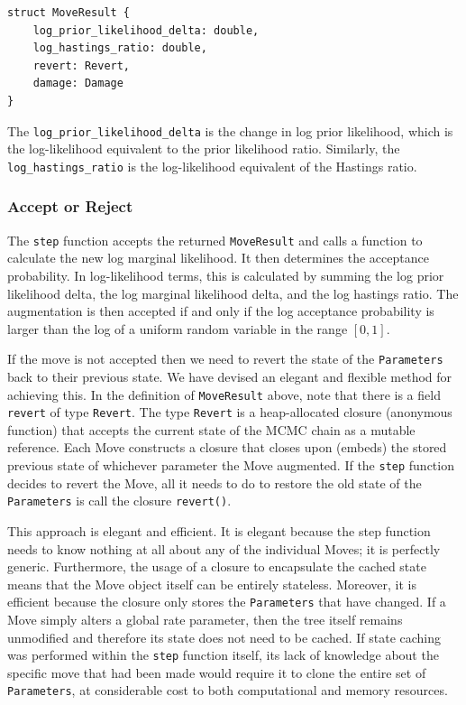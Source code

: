\documentclass[10pt,journal,compsoc]{IEEEtran}
\begin{document}
\begin{verbatim}
struct MoveResult {
    log_prior_likelihood_delta: double,
    log_hastings_ratio: double,
    revert: Revert,
    damage: Damage
}
\end{verbatim}

The \texttt{log\_prior\_likelihood\_delta} is the change in log prior likelihood, which is the log-likelihood equivalent to the prior likelihood ratio. Similarly, the \texttt{log\_hastings\_ratio} is the log-likelihood equivalent of the Hastings ratio.

\subsubsection{Accept or Reject}

The \texttt{step} function accepts the returned \texttt{MoveResult} and calls a function to calculate the new log marginal likelihood. It then determines the acceptance probability. In log-likelihood terms, this is calculated by summing the log prior likelihood delta, the log marginal likelihood delta, and the log hastings ratio. The augmentation is then accepted if and only if the log acceptance probability is larger than the log of a uniform random variable in the range $[0, 1]$.

If the move is not accepted then we need to revert the state of the \texttt{Parameters} back to their previous state. We have devised an elegant and flexible method for achieving this. In the definition of \texttt{MoveResult} above, note that there is a field \texttt{revert} of type \texttt{Revert}. The type \texttt{Revert} is a heap-allocated closure (anonymous function) that accepts the current state of the MCMC chain as a mutable reference. Each Move constructs a closure that closes upon (embeds) the stored previous state of whichever parameter the Move augmented. If the \texttt{step} function decides to revert the Move, all it needs to do to restore the old state of the \texttt{Parameters} is call the closure \texttt{revert()}.

This approach is elegant and efficient. It is elegant because the step function needs to know nothing at all about any of the individual Moves; it is perfectly generic. Furthermore, the usage of a closure to encapsulate the cached state means that the Move object itself can be entirely stateless. Moreover, it is efficient because the closure only stores the \texttt{Parameters} that have changed. If a Move simply alters a global rate parameter, then the tree itself remains unmodified and therefore its state does not need to be cached. If state caching was performed within the \texttt{step} function itself, its lack of knowledge about the specific move that had been made would require it to clone the entire set of \texttt{Parameters}, at considerable cost to both computational and memory resources. 
\end{document}
